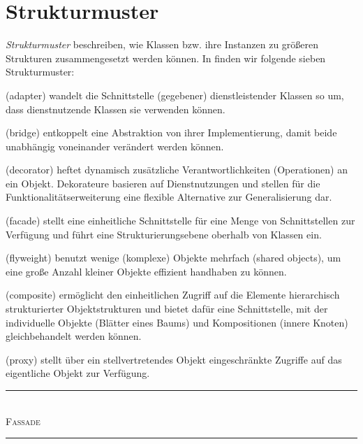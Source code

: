 \section{Strukturmuster}
\label{sec:Kap-10.2}

\textit{Strukturmuster} beschreiben, wie Klassen bzw. ihre Instanzen zu größeren Strukturen zusammengesetzt werden können. In \cite{gam95} finden wir folgende sieben Strukturmuster:

\begin{description}
	\setlength{\itemsep}{2mm} %
	
	\item[\textit{Adapter}] (adapter) wandelt die Schnittstelle (gegebener) dienstleistender Klassen so um, dass dienstnutzende Klassen sie verwenden können.
	\item[\textit{Brücke}] (bridge) entkoppelt eine Abstraktion von ihrer Implementierung, damit beide unabhängig voneinander verändert werden können.
	\item[\textit{Dekorateur}] (decorator) heftet dynamisch zusätzliche Verantwortlichkeiten (Operationen) an ein Objekt. Dekorateure basieren auf Dienstnutzungen und stellen für die Funktionalitätserweiterung eine flexible Alternative zur Generalisierung dar.
	\item[\textit{Fassade}] (facade) stellt eine einheitliche Schnittstelle für eine Menge von Schnitt\-stellen zur Verfügung und führt eine Strukturierungsebene oberhalb von Klassen ein.
	\item[\textit{Fliegengewicht}] (flyweight) benutzt wenige (komplexe) Objekte mehrfach (shared objects), um eine große Anzahl kleiner Objekte effizient handhaben zu können.
	\item[\textit{Kompositum}] (composite) ermöglicht den einheitlichen Zugriff auf die Elemente hierarchisch strukturierter Objektstrukturen und bietet dafür eine Schnittstelle, mit der individuelle Objekte (Blätter eines Baums) und Kompositionen (innere Knoten) gleichbehandelt werden können.
	\item[\textit{Proxy}] (proxy) stellt über ein stellvertretendes Objekt eingeschränkte Zugriffe auf das eigentliche Objekt zur Verfügung.
\end{description}

\vspace{\baselineskip} %

\vspace{\baselineskip}
\textcolor{FernUni-MI-green}{\noindent\rule[1ex]{\textwidth}{2pt}}\\
{\Large \textcolor{FernUni-MI-green}{\textsc{Fassade}}}\\
\textcolor{FernUni-MI-green}{\noindent\rule[1ex]{\textwidth}{2pt}}

